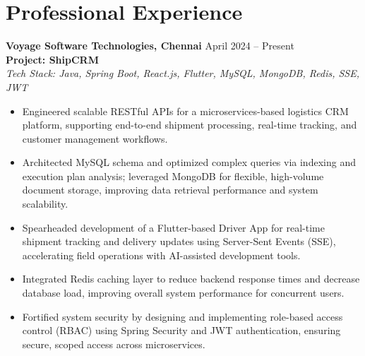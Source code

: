 \documentclass[a4paper,10pt]{article}
\begin{document}
\vspace{-12pt}

\section*{Professional Experience}

\textbf{Voyage Software Technologies, Chennai} \hfill April 2024 -- Present \\
\textbf{Project: ShipCRM} \\
\textit{Tech Stack: Java, Spring Boot, React.js, Flutter, MySQL, MongoDB, Redis, SSE, JWT}
\begin{itemize}
    \item Engineered scalable RESTful APIs for a microservices-based logistics CRM platform, supporting end-to-end shipment processing, real-time tracking, and customer management workflows.

    \item Architected MySQL schema and optimized complex queries via indexing and execution plan analysis; leveraged MongoDB for flexible, high-volume document storage, improving data retrieval performance and system scalability.

    \item Spearheaded development of a Flutter-based Driver App for real-time shipment tracking and delivery updates using Server-Sent Events (SSE), accelerating field operations with AI-assisted development tools.

    \item Integrated Redis caching layer to reduce backend response times and decrease database load, improving overall system performance for concurrent users.

    \item Fortified system security by designing and implementing role-based access control (RBAC) using Spring Security and JWT authentication, ensuring secure, scoped access across microservices.
\end{itemize}
\end{document}
